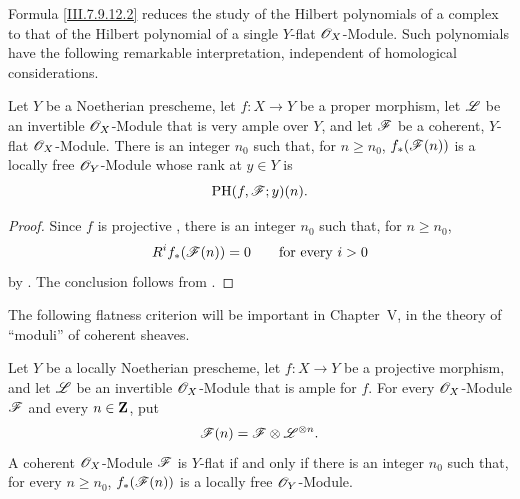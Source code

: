 Formula \eqref{III.7.9.12.2} reduces the study of the
Hilbert polynomials of a complex to that of the Hilbert
polynomial of a single $Y$-flat $\mathscr{O}_X$-Module.  Such
polynomials have the following remarkable interpretation,
independent of homological considerations.

\begin{corollary}[7.9.13]
\label{III.7.9.13}
Let $Y$ be a Noetherian prescheme, let $f:X\to Y$ be a
proper morphism, let $\mathscr{L}$ be an invertible
$\mathscr{O}_X$-Module that is very ample over $Y$, and let
$\mathscr{F}$ be a coherent, $Y$-flat $\mathscr{O}_X$-Module.  There
is an integer $n_0$ such that, for $n\geq n_0$,
$f_*(\mathscr{F}(n))$ is a locally free $\mathscr{O}_Y$-Module whose
rank at $y\in Y$ is
\[
  \operatorname{PH}(f,\mathscr{F};y)(n).
\]
\end{corollary}

\begin{proof}
Since $f$ is projective , there is an
integer $n_0$ such that, for $n\geq n_0$,
\[
  R^if_*(\mathscr{F}(n))=0
  \qquad\text{for every $i>0$}
\]
by .  The conclusion follows from
.
\end{proof}

The following flatness criterion will be important in
Chapter~V, in the theory of ``moduli'' of coherent
sheaves.

\begin{proposition}[7.9.14]
\label{III.7.9.14}
Let $Y$ be a locally Noetherian prescheme, let
$f:X\to Y$ be a projective morphism, and let $\mathscr{L}$ be
an invertible $\mathscr{O}_X$-Module that is ample for $f$.
For every $\mathscr{O}_X$-Module $\mathscr{F}$ and every
$n\in\mathbf{Z}$, put
\[
  \mathscr{F}(n)=\mathscr{F}\otimes\mathscr{L}^{\otimes n}.
\]
A coherent $\mathscr{O}_X$-Module $\mathscr{F}$ is $Y$-flat if and
only if there is an integer $n_0$ such that, for every
$n\geq n_0$, $f_*(\mathscr{F}(n))$ is a locally free
$\mathscr{O}_Y$-Module.
\end{proposition}

